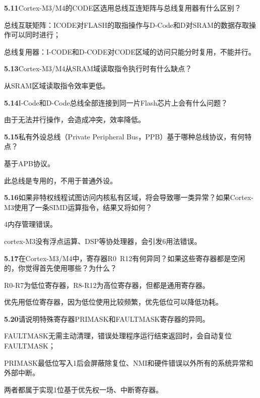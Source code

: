 \documentclass{article}
\begin{document}
    \noindent\textbf{5.11}Cortex-M3/M4的CODE区选用总线互连矩阵与总线复用器有什么区别？\par
    总线互联矩阵：ICODE对FLASH的取指操作与D-Code和D对SRAM的数据存取操作可以同时进行；\par
    总线复用器：I-CODE和D-CODE对CODE区域的访问只能分时复用，不能并行。
    \\[4pt]\par

    \noindent\textbf{5.13}Cortex-M3/M4从SRAM域读取指令执行时有什么缺点？\par
    从SRAM区域读取指令效率更低。
    \\[4pt]\par

    \noindent\textbf{5.14}I-Code和D-Code总线全部连接到同一片Flash芯片上会有什么问题？\par
    由于无法并行操作，会造成冲突，效率降低。
    \\[4pt]\par

    \noindent\textbf{5.15}私有外设总线（Private Peripheral Bus，PPB）基于哪种总线协议，有何特点？\par
    基于APB协议。\par
    此总线是专用的，不用于普通外设。
    \\[4pt]\par

    \noindent\textbf{5.16}如果非特权线程试图访问内核私有区域，将会导致哪一类异常？如果Cortex-M3使用了一条SIMD运算指令，结果又将如何？\par
    4内存管理错误。\par
    cortex-M3没有浮点运算、DSP等协处理器，会引发6用法错误。
    \\[4pt]\par

    \noindent\textbf{5.17}在Cortex-M3/M4中，寄存器R0~R12有何异同？如果这些寄存器都是空闲的，你觉得首先使用哪些？为什么？\par
    R0-R7为低位寄存器，R8-R12为高位寄存器，但都是通用寄存器。\par
    优先用低位寄存器，因为低位使用比较频繁，优先低位可以降低功耗。
    \\[4pt]\par

    \noindent\textbf{5.20}请说明特殊寄存器PRIMASK和FAULTMASK寄存器的异同。\par
    FAULTMASK无需主动清理，错误处理程序运行结束返回时，会自动复位FAULTMASK；\par
    PRIMASK最低位写入1后会屏蔽除复位、NMI和硬件错误以外所有的系统异常和外部中断。\par
    两者都属于实现1位基于优先权一场、中断寄存器。
    \\[4pt]\par
\end{document}
